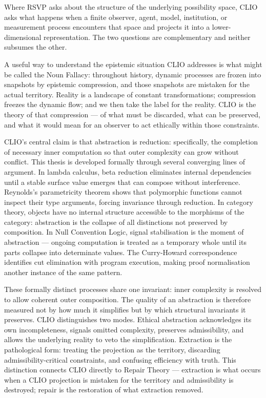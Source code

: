 \documentclass[12pt, twoside]{article}
\begin{document}
Where RSVP asks about the structure of the underlying possibility space, CLIO
asks what happens when a finite observer, agent, model, institution, or
measurement process encounters that space and projects it into a
lower-dimensional representation. The two questions are complementary and
neither subsumes the other.

A useful way to understand the epistemic situation CLIO addresses is what
might be called the Noun Fallacy: throughout history, dynamic processes are
frozen into snapshots by epistemic compression, and those snapshots are
mistaken for the actual territory. Reality is a landscape of constant
transformations; compression freezes the dynamic flow; and we then take the
label for the reality. CLIO is the theory of that compression — of what
must be discarded, what can be preserved, and what it would mean for an
observer to act ethically within those constraints.

CLIO's central claim is that abstraction is reduction: specifically, the
completion of necessary inner computation so that outer complexity can grow
without conflict. This thesis is developed formally through several
converging lines of argument. In lambda calculus, beta reduction eliminates
internal dependencies until a stable surface value emerges that can compose
without interference. Reynolds's parametricity theorem shows that polymorphic
functions cannot inspect their type arguments, forcing invariance through
reduction. In category theory, objects have no internal structure accessible
to the morphisms of the category: abstraction is the collapse of all
distinctions not preserved by composition. In Null Convention Logic, signal
stabilisation is the moment of abstraction — ongoing computation is treated
as a temporary whole until its parts collapse into determinate values. The
Curry-Howard correspondence identifies cut elimination with program execution,
making proof normalisation another instance of the same pattern.

These formally distinct processes share one invariant: inner complexity is
resolved to allow coherent outer composition. The quality of an abstraction
is therefore measured not by how much it simplifies but by which structural
invariants it preserves. CLIO distinguishes two modes. Ethical abstraction
acknowledges its own incompleteness, signals omitted complexity, preserves
admissibility, and allows the underlying reality to veto the simplification.
Extraction is the pathological form: treating the projection as the territory,
discarding admissibility-critical constraints, and confusing efficiency with
truth. This distinction connects CLIO directly to Repair Theory — extraction
is what occurs when a CLIO projection is mistaken for the territory and
admissibility is destroyed; repair is the restoration of what extraction
removed.
\end{document}
